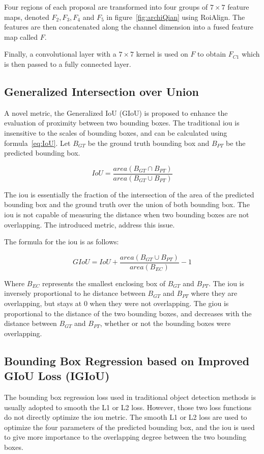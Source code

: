 Four regions of each proposal are transformed into four groups of $7 \times 7$ feature maps, denoted $F_2, F_3, F_4$ and $F_5$ in figure~\ref{fig:archiQian} using RoiAlign\cite{resNet}. The features are then concatenated along the channel dimension into a fused feature map called $F$.

Finally, a convolutional layer with a $7 \times 7$ kernel is used on $F$ to obtain $F_{C1}$ which is then passed to a fully connected layer.

\subsection{Generalized Intersection over Union}


A novel metric, the Generalized IoU (GIoU) is proposed to enhance the evaluation of proximity between two bounding boxes. The traditional \gls{iou} is insensitive to the scales of bounding boxes, and can be calculated using formula~\ref{eq:IoU}. Let $B_{GT}$ be the ground truth bounding box and $B_{PT}$ be the predicted bounding box.

\begin{equation}\label{eq:IoU}
	IoU = \frac{area(B_{GT} \cap B_{PT})}{area(B_{GT} \cup B_{PT})}
\end{equation}

The \gls{iou} is essentially the fraction of the intersection of the area of the predicted bounding box and the ground truth over the union of both bounding box. The \gls{iou} is not capable of measuring the distance when two bounding boxes are not overlapping. The introduced metric, address this issue.

The formula for the \gls{iou} is as follows:

\begin{equation}
	GIoU = IoU + \frac{area(B_{GT} \cup B_{PT})}{area(B_{EC})} - 1
\end{equation}

Where $B_{EC}$ represents the smallest enclosing box of $B_{GT}$ and $B_{PT}$. The \gls{iou} is inversely proportional to he distance between $B_{GT}$ and $B_{PT}$ where they are overlapping, but stays at 0 when they were not overlapping. The \gls{giou} is proportional to the distance of the two bounding boxes, and decreases with the distance between $B_{GT}$ and $B_{PT}$, whether or not the bounding boxes were overlapping.

\subsection{Bounding Box Regression based on Improved GIoU Loss (IGIoU)}
The bounding box regression loss used in traditional object detection methods is usually adopted to smooth the L1 or L2 loss. However, those two loss functions do not directly optimize the \gls{iou} metric. The smooth L1 or L2 loss are used to optimize the four parameters of the predicted bounding box, and the \gls{iou} is used to give more importance to the overlapping degree between the two bounding boxes. 

